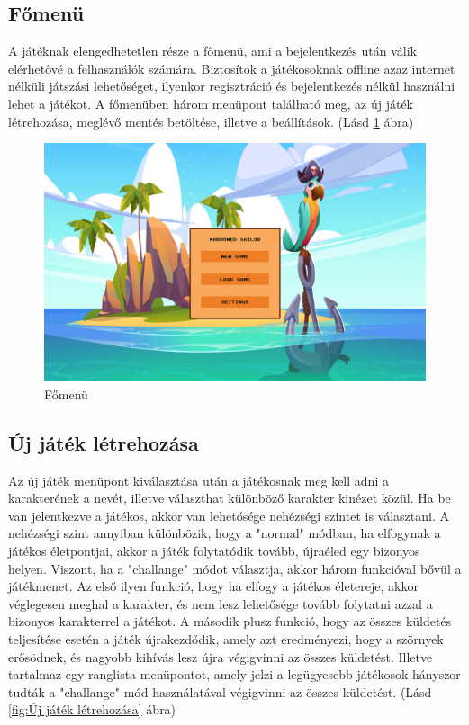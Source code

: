 \subsection{Főmenü}

\indent \indent A játéknak elengedhetetlen része a főmenü, ami a bejelentkezés után válik elérhetővé a felhasználók számára. Biztosítok a játékosoknak offline azaz internet nélküli játszási lehetőséget, ilyenkor regisztráció és bejelentkezés nélkül használni lehet a játékot.
A főmenüben három menüpont található meg, az új játék létrehozása, meglévő mentés betöltése, illetve a beállítások. (Lásd \ref{fig:Főmenü} ábra) 



\begin{figure}[H]
    \centering
    \includegraphics[width=15.0truecm]{images/mainmenu.png}
    \caption{Főmenü}
    \label{fig:Főmenü}
\end{figure}



\subsection{Új játék létrehozása}
\indent \indent Az új játék menüpont kiválasztása után a játékosnak meg kell adni a karakterének a nevét, illetve választhat különböző karakter kinézet közül. Ha be van jelentkezve a játékos, akkor van lehetősége nehézségi szintet is választani.
A nehézségi szint annyiban különbözik, hogy a "normal" módban, ha elfogynak a játékos életpontjai, akkor a játék folytatódik tovább, újraéled egy bizonyos helyen. Viszont, ha a "challange"  módot választja, akkor három funkcióval bővül a játékmenet. Az első ilyen funkció, hogy ha elfogy a játékos életereje, akkor véglegesen meghal a karakter, és nem lesz lehetősége tovább folytatni azzal a bizonyos karakterrel a játékot. A második plusz funkció, hogy az összes küldetés teljesítése esetén a játék újrakezdődik, amely azt eredményezi, hogy a szörnyek erősödnek, és nagyobb kihívás lesz újra végigvinni az összes küldetést. Illetve tartalmaz egy ranglista menüpontot, amely jelzi a legügyesebb játékosok hányszor tudták a "challange" mód használatával végigvinni az összes küldetést. (Lásd \ref{fig:Új játék létrehozása} ábra)

